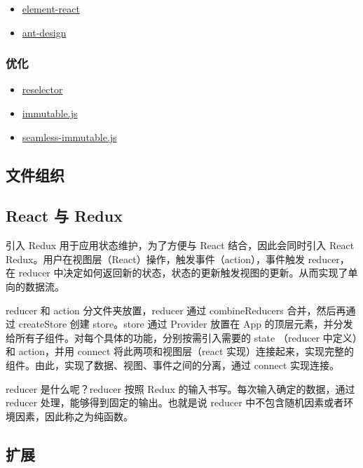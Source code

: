 \begin{itemize}
\tightlist
\item
  \href{https://eleme.github.io/element-react/}{element-react}
\item
  \href{https://ant.design/}{ant-design}
\end{itemize}

\subsubsection{优化}\label{ux4f18ux5316}

\begin{itemize}
\tightlist
\item
  \href{https://github.com/reactjs/reselect}{reselector}
\item
  \href{https://github.com/facebook/immutable-js}{immutable.js}
\item
  \href{https://github.com/rtfeldman/seamless-immutable}{seamless-immutable.js}
\end{itemize}

\subsection{文件组织}\label{ux6587ux4ef6ux7ec4ux7ec7}

\subsection{React 与 Redux}\label{react-ux4e0e-redux}

引入 Redux 用于应用状态维护，为了方便与 React 结合，因此会同时引入 React
Redux。用户在视图层（React）操作，触发事件（action），事件触发
reducer，在 reducer
中决定如何返回新的状态，状态的更新触发视图的更新。从而实现了单向的数据流。

reducer 和 action 分文件夹放置，reducer 通过 combineReducers
合并，然后再通过 createStore 创建 store。store 通过 Provider 放置在 App
的顶层元素，并分发给所有子组件。对每个具体的功能，分别按需引入需要的
state （reducer 中定义）和 action，并用 connect 将此两项和视图层（react
实现）连接起来，实现完整的组件。由此，实现了数据、视图、事件之间的分离，通过
connect 实现连接。

reducer 是什么呢？reducer 按照 Redux
的输入书写。每次输入确定的数据，通过 reducer
处理，能够得到固定的输出。也就是说 reducer
中不包含随机因素或者环境因素，因此称之为纯函数。

\subsection{扩展}\label{ux6269ux5c55}


